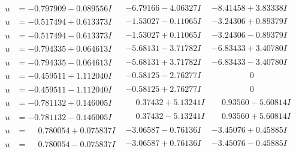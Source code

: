 \documentclass[1p]{elsarticle_modified}
\theoremstyle{definition}
\begin{document}
$$\begin{array}{c|c|c}
\begin{aligned}
u &= -0.797909 - 0.089556 I\end{aligned}
 & -6.79166 - 4.06327 I & -8.41458 + 3.83338 I \\ \hline\begin{aligned}
u &= -0.517494 + 0.613373 I\end{aligned}
 & -1.53027 - 0.11065 I & -3.24306 + 0.89379 I \\ \hline\begin{aligned}
u &= -0.517494 - 0.613373 I\end{aligned}
 & -1.53027 + 0.11065 I & -3.24306 - 0.89379 I \\ \hline\begin{aligned}
u &= -0.794335 + 0.064613 I\end{aligned}
 & -5.68131 - 3.71782 I & -6.83433 + 3.40780 I \\ \hline\begin{aligned}
u &= -0.794335 - 0.064613 I\end{aligned}
 & -5.68131 + 3.71782 I & -6.83433 - 3.40780 I \\ \hline\begin{aligned}
u &= -0.459511 + 1.112040 I\end{aligned}
 & -0.58125 - 2.76277 I & \phantom{-0.000000 } 0 \\ \hline\begin{aligned}
u &= -0.459511 - 1.112040 I\end{aligned}
 & -0.58125 + 2.76277 I & \phantom{-0.000000 } 0 \\ \hline\begin{aligned}
u &= -0.781132 + 0.146005 I\end{aligned}
 & \phantom{-}0.37432 + 5.13241 I & \phantom{-}0.93560 - 5.60814 I \\ \hline\begin{aligned}
u &= -0.781132 - 0.146005 I\end{aligned}
 & \phantom{-}0.37432 - 5.13241 I & \phantom{-}0.93560 + 5.60814 I \\ \hline\begin{aligned}
u &= \phantom{-}0.780054 + 0.075837 I\end{aligned}
 & -3.06587 - 0.76136 I & -3.45076 + 0.45885 I \\ \hline\begin{aligned}
u &= \phantom{-}0.780054 - 0.075837 I\end{aligned}
 & -3.06587 + 0.76136 I & -3.45076 - 0.45885 I \\ \hline\begin{aligned}

\end{aligned}
\end{array}$$
\end{document}
